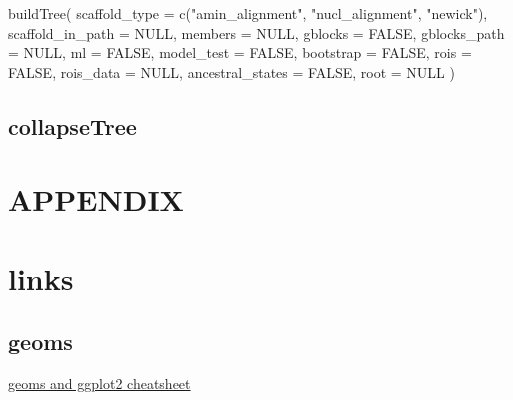 \documentclass[
]{krantz}
\newenvironment{Shaded}{\begin{snugshade}}{\end{snugshade}}
\newcommand{\AttributeTok}[1]{\textcolor[rgb]{0.77,0.63,0.00}{#1}}
\newcommand{\ConstantTok}[1]{\textcolor[rgb]{0.00,0.00,0.00}{#1}}
\newcommand{\FunctionTok}[1]{\textcolor[rgb]{0.00,0.00,0.00}{#1}}
\newcommand{\NormalTok}[1]{#1}
\newcommand{\StringTok}[1]{\textcolor[rgb]{0.31,0.60,0.02}{#1}}
\begin{document}
\begin{Shaded}
\begin{Highlighting}[]
\FunctionTok{buildTree}\NormalTok{(}
  \AttributeTok{scaffold\_type =} \FunctionTok{c}\NormalTok{(}\StringTok{"amin\_alignment"}\NormalTok{, }\StringTok{"nucl\_alignment"}\NormalTok{, }\StringTok{"newick"}\NormalTok{),}
  \AttributeTok{scaffold\_in\_path =} \ConstantTok{NULL}\NormalTok{,}
  \AttributeTok{members =} \ConstantTok{NULL}\NormalTok{,}
  \AttributeTok{gblocks =} \ConstantTok{FALSE}\NormalTok{, }
  \AttributeTok{gblocks\_path =} \ConstantTok{NULL}\NormalTok{,}
  \AttributeTok{ml =} \ConstantTok{FALSE}\NormalTok{, }
  \AttributeTok{model\_test =} \ConstantTok{FALSE}\NormalTok{,}
  \AttributeTok{bootstrap =} \ConstantTok{FALSE}\NormalTok{,}
  \AttributeTok{rois =} \ConstantTok{FALSE}\NormalTok{, }
  \AttributeTok{rois\_data =} \ConstantTok{NULL}\NormalTok{,}
  \AttributeTok{ancestral\_states =} \ConstantTok{FALSE}\NormalTok{,}
  \AttributeTok{root =} \ConstantTok{NULL}
\NormalTok{)}
\end{Highlighting}
\end{Shaded}

\hypertarget{collapsetree}{%
\subsection{collapseTree}\label{collapsetree}}

\hypertarget{section-4}{%
\section*{}\label{section-4}}

\hypertarget{appendix}{%
\section*{APPENDIX}\label{appendix}}

\hypertarget{links}{%
\section{links}\label{links}}

\hypertarget{geoms-1}{%
\subsection{geoms}\label{geoms-1}}

\href{https://thebustalab.github.io/R_For_Chemists_3/images/ggplot2_geoms.pdf}{geoms and ggplot2 cheatsheet}
\end{document}
